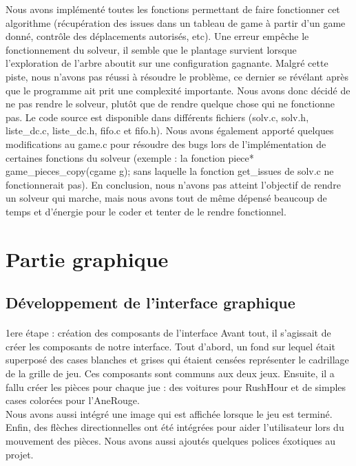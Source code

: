 \documentclass[20pt]{article}
\begin{document}
Nous avons implémenté toutes les fonctions permettant de faire fonctionner cet algorithme (récupération des issues dans un tableau de game à partir d'un game donné, contrôle des déplacements autorisés, etc). 
Une erreur empêche le fonctionnement du solveur, il semble que le plantage survient lorsque l'exploration de l'arbre aboutit sur une configuration gagnante. Malgré cette piste, nous n'avons pas réussi à résoudre le problème, ce dernier se révélant après que le programme ait prit une complexité importante. Nous avons donc décidé de ne pas rendre le solveur, plutôt que de rendre quelque chose qui ne fonctionne pas. Le code source est disponible dans différents fichiers (solv.c, solv.h, liste\_dc.c, liste\_dc.h, fifo.c et fifo.h). Nous avons également apporté quelques modifications au game.c pour résoudre des bugs lors de l'implémentation de certaines fonctions du solveur (exemple : la fonction piece* game\_pieces\_copy(cgame g); sans laquelle la fonction get\_issues de solv.c ne fonctionnerait pas).
En conclusion, nous n'avons pas atteint l'objectif de rendre un solveur qui marche, mais nous avons tout de même dépensé beaucoup de temps et d'énergie pour le coder et tenter de le rendre fonctionnel.

\section{Partie graphique}
\subsection{Développement de l'interface graphique}
\paragraph{}

1ere étape : création des composants de l'interface
Avant tout, il s'agissait de créer les composants de notre interface. Tout d'abord, un fond sur lequel était superposé des cases blanches et grises qui étaient censées représenter le cadrillage de la grille de jeu. Ces composants sont communs aux deux jeux. Ensuite, il a fallu créer les pièces pour chaque jue : des voitures pour RushHour et de simples cases colorées pour l'AneRouge. \\
Nous avons aussi intégré une image qui est affichée lorsque le jeu est terminé. Enfin, des flèches directionnelles ont été intégrées pour aider l'utilisateur lors du mouvement des pièces.
Nous avons aussi ajoutés quelques polices éxotiques au projet.
\end{document}
